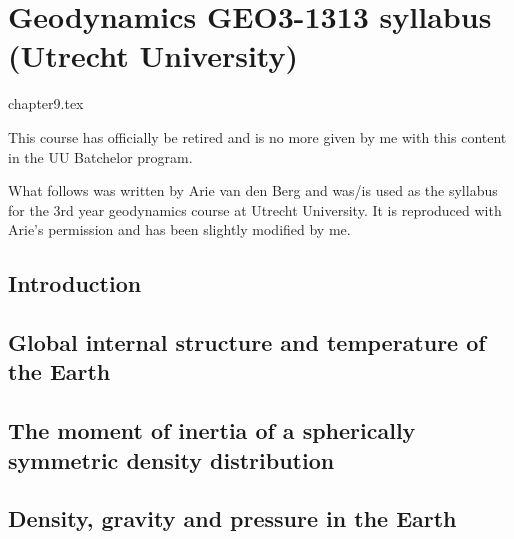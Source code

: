 \chapter{Geodynamics GEO3-1313 syllabus (Utrecht University)} %

\begin{flushright} {\tiny {\color{gray} chapter9.tex}} \end{flushright}


\begin{center}
{\Large \color{teal} This course has officially be retired and is no more given by me 
with this content in the UU Batchelor program.}
\end{center}

What follows was written by Arie van den Berg and was/is used as the syllabus for the 
3rd year geodynamics course at Utrecht University. It is reproduced with Arie's permission
and has been slightly modified by me.

\section{Introduction} 
 

\section{Global internal structure and temperature of the Earth} 
 

\section{The moment of inertia of a spherically symmetric density distribution} 
\label{sect_scalarmomint}  

\newpage
\section{Density, gravity and pressure in the Earth} 
\label{section_Density-gravity-pressure}  

